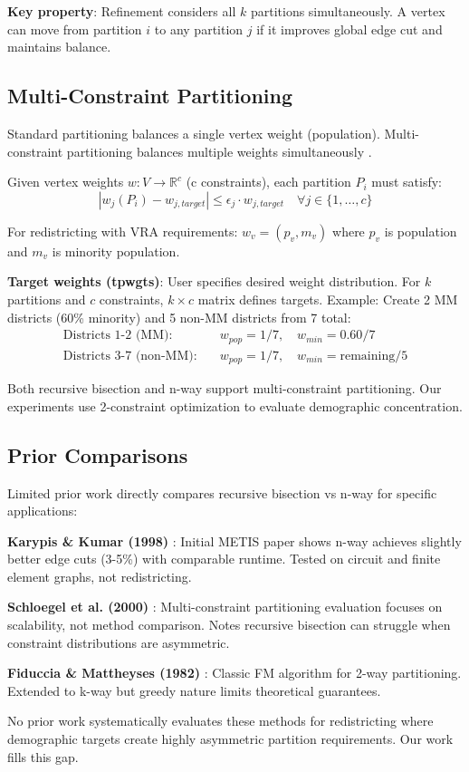 \textbf{Key property}: Refinement considers all $k$ partitions simultaneously. A vertex can move from partition $i$ to any partition $j$ if it improves global edge cut and maintains balance.

\subsection{Multi-Constraint Partitioning}

Standard partitioning balances a single vertex weight (population). Multi-constraint partitioning balances multiple weights simultaneously \citep{karypis1999,schloegel2000}.

Given vertex weights $w: V \to \mathbb{R}^c$ (c constraints), each partition $P_i$ must satisfy:
\begin{equation}
|w_j(P_i) - w_{j,target}| \leq \epsilon_j \cdot w_{j,target} \quad \forall j \in \{1, \ldots, c\}
\end{equation}

For redistricting with VRA requirements: $w_v = (p_v, m_v)$ where $p_v$ is population and $m_v$ is minority population.

\textbf{Target weights (tpwgts)}: User specifies desired weight distribution. For $k$ partitions and $c$ constraints, $k \times c$ matrix defines targets. Example: Create 2 MM districts (60\% minority) and 5 non-MM districts from 7 total:
\begin{align*}
\text{Districts 1-2 (MM):} \quad & w_{pop} = 1/7, \quad w_{min} = 0.60/7 \\
\text{Districts 3-7 (non-MM):} \quad & w_{pop} = 1/7, \quad w_{min} = \text{remaining}/5
\end{align*}

Both recursive bisection and n-way support multi-constraint partitioning. Our experiments use 2-constraint optimization to evaluate demographic concentration.

\subsection{Prior Comparisons}

Limited prior work directly compares recursive bisection vs n-way for specific applications:

\textbf{Karypis \& Kumar (1998)} \citep{karypis1998}: Initial METIS paper shows n-way achieves slightly better edge cuts (3-5\%) with comparable runtime. Tested on circuit and finite element graphs, not redistricting.

\textbf{Schloegel et al. (2000)} \citep{schloegel2000}: Multi-constraint partitioning evaluation focuses on scalability, not method comparison. Notes recursive bisection can struggle when constraint distributions are asymmetric.

\textbf{Fiduccia \& Mattheyses (1982)} \citep{fiduccia1982}: Classic FM algorithm for 2-way partitioning. Extended to k-way but greedy nature limits theoretical guarantees.

No prior work systematically evaluates these methods for redistricting where demographic targets create highly asymmetric partition requirements. Our work fills this gap.
